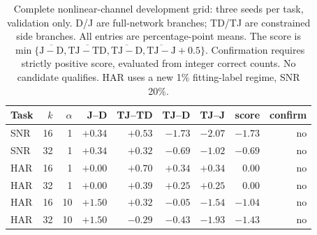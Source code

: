 \begin{table}[t]
\centering
\caption{Complete nonlinear-channel development grid: three seeds per task, validation only. D/J are full-network branches; TD/TJ are constrained side branches. All entries are percentage-point means. The score is $\min\{\overline{\mathrm{J-D}},\overline{\mathrm{TJ-TD}},\overline{\mathrm{TJ-D}},\overline{\mathrm{TJ-J}}+0.5\}$. Confirmation requires strictly positive score, evaluated from integer correct counts. No candidate qualifies. HAR uses a new 1\% fitting-label regime, SNR 20\%.}
\label{tab:nonlinear_development}
\small
\begin{tabular}{lrrrrrrrr}
\toprule
Task & $k$ & $\alpha$ & J--D & TJ--TD & TJ--D & TJ--J & score & confirm \\
\midrule
SNR & 16 & 1 & $+0.34$ & $+0.53$ & $-1.73$ & $-2.07$ & $-1.73$ & no \\
SNR & 32 & 1 & $+0.34$ & $+0.32$ & $-0.69$ & $-1.02$ & $-0.69$ & no \\
HAR & 16 & 1 & $+0.00$ & $+0.70$ & $+0.34$ & $+0.34$ & $0.00$ & no \\
HAR & 32 & 1 & $+0.00$ & $+0.39$ & $+0.25$ & $+0.25$ & $0.00$ & no \\
HAR & 16 & 10 & $+1.50$ & $+0.32$ & $-0.05$ & $-1.54$ & $-1.04$ & no \\
HAR & 32 & 10 & $+1.50$ & $-0.29$ & $-0.43$ & $-1.93$ & $-1.43$ & no \\
\bottomrule
\end{tabular}
\end{table}
